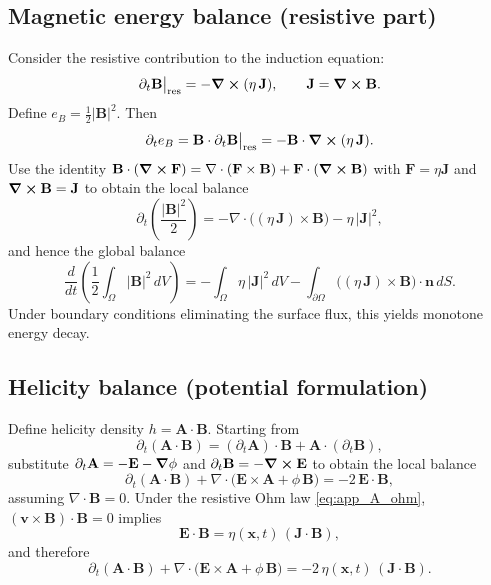 \documentclass[11pt]{article}
\theoremstyle{plain}
\theoremstyle{definition}
\theoremstyle{remark}
\newcommand{\diver}{\nabla\cdot}
\newcommand{\A}{\mathbf{A}}
\newcommand{\B}{\mathbf{B}}
\newcommand{\E}{\mathbf{E}}
\newcommand{\J}{\mathbf{J}}
\newcommand{\vfield}{\mathbf{v}}
\begin{document}
\subsection{Magnetic energy balance (resistive part)}
Consider the resistive contribution to the induction equation:
\begin{equation}\label{eq:app_A_res_part}
  \partial_t\B\big|_{\mathrm{res}} = -\curl(\eta\,\J),
  \qquad \J=\curl\B.
\end{equation}
Define $e_B=\tfrac12|\B|^2$. Then
\[
\partial_t e_B = \B\cdot\partial_t\B\big|_{\mathrm{res}} = -\B\cdot\curl(\eta\,\J).
\]
Use the identity $\B\cdot(\curl\mathbf{F})=\diver(\mathbf{F}\times\B)+\mathbf{F}\cdot(\curl\B)$ with
$\mathbf{F}=\eta\J$ and $\curl\B=\J$ to obtain the local balance
\begin{equation}\label{eq:app_A_energy_local}
  \partial_t\!\left(\frac{|\B|^2}{2}\right)
  = -\diver\!\big((\eta\,\J)\times\B\big) - \eta\,|\J|^2,
\end{equation}
and hence the global balance
\begin{equation}\label{eq:app_A_energy_global}
  \frac{d}{dt}\left(\frac12\int_{\Omega}|\B|^2\,dV\right)
  = -\int_{\Omega}\eta\,|\J|^2\,dV
    -\int_{\partial\Omega}\big((\eta\,\J)\times\B\big)\cdot\mathbf{n}\,dS.
\end{equation}
Under boundary conditions eliminating the surface flux, this yields monotone energy decay.

\subsection{Helicity balance (potential formulation)}
Define helicity density $h=\A\cdot\B$. Starting from
\[
\partial_t(\A\cdot\B) = (\partial_t\A)\cdot\B + \A\cdot(\partial_t\B),
\]
substitute $\partial_t\A=-\E-\grad\phi$ and $\partial_t\B=-\curl\E$ to obtain the local balance
\begin{equation}\label{eq:app_A_helicity_local}
  \partial_t(\A\cdot\B) + \diver\!\big(\E\times\A + \phi\,\B\big) = -2\,\E\cdot\B,
\end{equation}
assuming $\diver\B=0$. Under the resistive Ohm law \eqref{eq:app_A_ohm}, $(\vfield\times\B)\cdot\B=0$
implies
\begin{equation}\label{eq:app_A_EdotB}
  \E\cdot\B = \eta(\mathbf{x},t)\,(\J\cdot\B),
\end{equation}
and therefore
\begin{equation}\label{eq:app_A_helicity_local_eta}
  \partial_t(\A\cdot\B) + \diver\!\big(\E\times\A + \phi\,\B\big) = -2\,\eta(\mathbf{x},t)\,(\J\cdot\B).
\end{equation}
\end{document}
